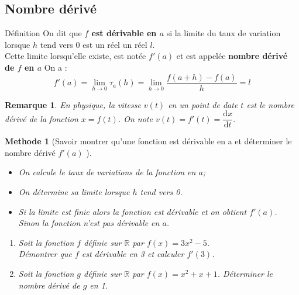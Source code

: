 \documentclass[10pt,a4paper]{article}
\def\R{{\mathbb R}}
\def\D{{\mathbb D}}
\theoremstyle{break}
\newtheorem{Rem}{Remarque}
\newtheorem{Meth}{Methode}
\begin{document}
\subsection{Nombre dérivé }
	\begin{bclogo}[couleur = yellow!30, arrondi = 0.1,logo=\bcbook]{Définition}
	On dit que \textbf{$f$ est dérivable en $a$} si la limite du taux de variation lorsque $h$ tend vers 0 est un réel un réel $l$.\\
	Cette limite lorsqu'elle existe, est notée $f'(a)$ et est appelée \textbf{nombre dérivé de $f$ en $a$}
On a :\boldmath\[ f'(a)=\lim_{h\to0}\tau_a(h)=\lim_{h\to0}\frac{f(a+h)-f(a)}{h}=l \]\unboldmath
\end{bclogo}
\begin{Rem}
	En physique, la vitesse $v(t)$ en un point de date $t$ est le nombre dérivé de la fonction $x =f(t)$. On note $v(t) =f'(t) =\dfrac{\text{d}x}{\text{d}t}.$
\end{Rem}
\begin{Meth}[Savoir montrer qu'une fonction est dérivable en a et déterminer le nombre dérivé $f'(a)$ ]
\begin{itemize}
	\item On calcule le taux de variations de la fonction en $a$;
	\item On détermine sa limite lorsque $h$ tend vers 0.
	\item Si la limite est finie alors la fonction est dérivable et on obtient $f'(a)$.\\
	Sinon la fonction n'est pas dérivable en $a$.
\end{itemize}
	\begin{enumerate}
		\item Soit la fonction $f$ définie sur $\R $ par $f(x)=3x^2-5$.\\Démontrer que $f$ est dérivable en 3 et calculer $f'(3)$.
		\item Soit la fonction $g$ définie sur $\R$ par $f(x)=x^2+x+1$. Déterminer le nombre dérivé de $g$ en 1.
	\end{enumerate}
\end{Meth}
\end{document}
